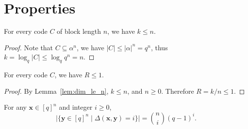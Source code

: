 \section{Properties}
\begin{lemma}
    \label{lem:dim_le_n}
    \leanok
    For every code $C$ of block length $n$, we have $k \leq n$.
\end{lemma}

\begin{proof}
    \leanok
    Note that $C \subseteq \alpha^{n}$, we have $\lvert C\rvert \le \lvert\alpha\rvert^{n} = q^{n}$, thus $k = \log_{q}\lvert C\rvert \le \log_{q} q^{n} = n$.
\end{proof}
 
\begin{lemma}
    \label{lem:rate_le_one}
    \leanok
    For every code $C$, we have $R \leq 1$.
\end{lemma}
\begin{proof}
    \leanok
    By Lemma~\ref{lem:dim_le_n}, $k \leq n$, and $n \ge 0$.
    Therefore $R = k/n \leq 1$.
\end{proof}

\begin{lemma}
  \label{lemma:SphereCard}
  \leanok
  For any $\mathbf{x} \in [q]^n$ and integer $i \geq 0$,
  \[\bigl|\{\mathbf{y} \in [q]^n \mid \Delta(\mathbf{x}, \mathbf{y}) = i\}\bigr| = \binom{n}{i}(q-1)^i.\]
\end{lemma}

